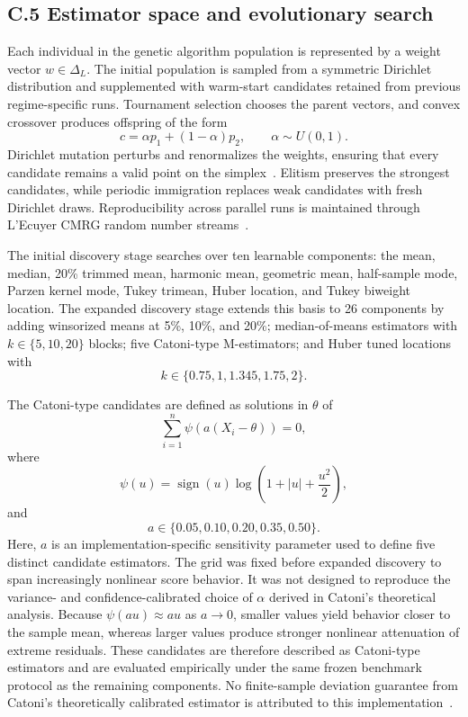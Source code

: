 \subsection*{C.5 Estimator space and evolutionary search}
Each individual in the genetic algorithm population is represented by a weight vector $w\in\Delta_L$. The initial population is sampled from a symmetric Dirichlet distribution and supplemented with warm-start candidates retained from previous regime-specific runs. Tournament selection chooses the parent vectors, and convex crossover produces offspring of the form
\[
c=\alpha p_1+(1-\alpha)p_2,
\qquad
\alpha\sim U(0,1).
\]
Dirichlet mutation perturbs and renormalizes the weights, ensuring that every candidate remains a valid point on the simplex~\citep{Aitchison1982,PawlowskyGlahn2015}. Elitism preserves the strongest candidates, while periodic immigration replaces weak candidates with fresh Dirichlet draws. Reproducibility across parallel runs is maintained through L'Ecuyer CMRG random number streams~\citep{lecuyer2002streams}.

The initial discovery stage searches over ten learnable components: the mean, median, 20\% trimmed mean, harmonic mean, geometric mean, half-sample mode, Parzen kernel mode, Tukey trimean, Huber location, and Tukey biweight location. The expanded discovery stage extends this basis to 26 components by adding
winsorized means at 5\%, 10\%, and 20\%; median-of-means estimators with
\(k\in\{5,10,20\}\) blocks; five Catoni-type M-estimators; and Huber tuned
locations with
\[
k\in\{0.75,1,1.345,1.75,2\}.
\]

The Catoni-type candidates are defined as solutions in \(\theta\) of
\[
\sum_{i=1}^{n}
\psi\!\left(a(X_i-\theta)\right)=0,
\]
where
\[
\psi(u)
=
\operatorname{sign}(u)
\log\!\left(1+|u|+\frac{u^2}{2}\right),
\]
and
\[
a\in\{0.05,0.10,0.20,0.35,0.50\}.
\]
Here, \(a\) is an implementation-specific sensitivity parameter used to
define five distinct candidate estimators. The grid was fixed before
expanded discovery to span increasingly nonlinear score behavior. It was not
designed to reproduce the variance- and confidence-calibrated choice of
\(\alpha\) derived in Catoni's theoretical analysis. Because
\(\psi(a u)\approx a u\) as \(a\rightarrow0\), smaller values yield behavior
closer to the sample mean, whereas larger values produce stronger nonlinear
attenuation of extreme residuals. These candidates are therefore described
as Catoni-type estimators and are evaluated empirically under the same frozen
benchmark protocol as the remaining components. No finite-sample deviation guarantee from Catoni's theoretically calibrated
estimator is attributed to this implementation~\citep{catoni2012challenging}.

